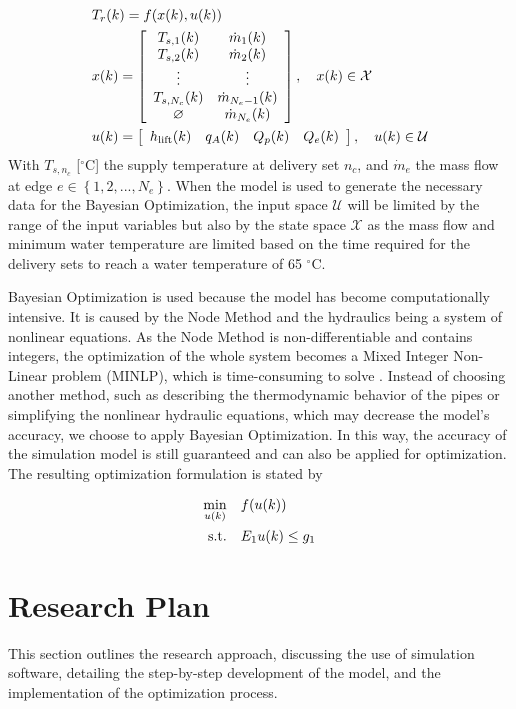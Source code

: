\begin{align}
& T_r(k) = f(x(k), u(k)) \notag \\
& x(k) = 
\left[\begin{array}{cc}
T_{s,1}(k) & \dot{m}_1(k)  \\
T_{s,2}(k) & \dot{m}_2(k) \\
 \vdots  & \vdots \\
T_{s,N_c}(k) & \dot{m}_{N_e - 1}(k) \\
\varnothing & \dot{m}_{N_e}(k)  
\end{array}\right], \quad x(k) \in \mathcal{X}\\
&u(k) =  \left[\begin{array}{cccc}
h_{\text{lift}}(k) & q_A(k) & Q_p(k) & Q_e(k) 
\end{array}\right], \quad u(k) \in \mathcal{U} \notag 
\end{align}
With $T_{s,n_c}$ [$^{\circ}\text{C}$] the supply temperature at delivery set $n_c$, and $\dot{m}_{e}$ the mass flow at edge $e \in \left\{1,2,...,N_e \right\}$. When the model is used to generate the necessary data for the Bayesian Optimization, the input space $\mathcal{U}$ will be limited by the range of the input variables but also by the state space $\mathcal{X}$ as the mass flow and minimum water temperature are limited based on the time required for the delivery sets to reach a water temperature of 65 $^{\circ}\text{C}$. 

Bayesian Optimization is used because the model has become computationally intensive. It is caused by the Node Method and the hydraulics being a system of nonlinear equations. As the Node Method is non-differentiable and contains integers, the optimization of the whole system becomes a Mixed Integer Non-Linear problem (MINLP), which is time-consuming to solve \cite{MAURER2021244}. Instead of choosing another method, such as describing the thermodynamic behavior of the pipes or simplifying the nonlinear hydraulic equations, which may decrease the model's accuracy, we choose to apply Bayesian Optimization. In this way, the accuracy of the simulation model is still guaranteed and can also be applied for optimization. The resulting optimization formulation is stated by 

\begin{align}
\min_{u(k)} & \quad f(u(k)) \\
\text{s.t.} & \quad E_1 u(k)  \leq g_1 \notag 
\end{align}
\section{Research Plan}
This section outlines the research approach, discussing the use of simulation software, detailing the step-by-step development of the model, and the implementation of the optimization process.

